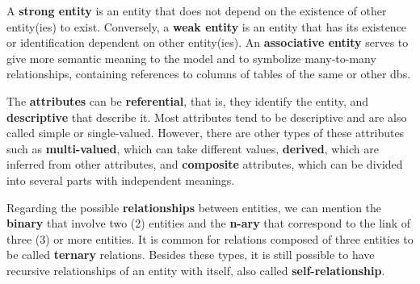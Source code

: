A \textbf{strong entity} is an entity that does not depend on the existence of other entity(ies) to exist.
Conversely, a \textbf{weak entity} is an entity that has its existence or identification dependent on other entity(ies).
An \textbf{associative entity} serves to give more semantic meaning to the model and to symbolize many-to-many relationships, containing references to columns of tables of the same or other \acp{db}.

The \textbf{attributes} can be \textbf{referential}, that is, they identify the entity, and \textbf{descriptive} that describe it.
Most attributes tend to be descriptive and are also called simple or single-valued.
However, there are other types of these attributes such as \textbf{multi-valued}, which can take different values, \textbf{derived}, which are inferred from other attributes, and \textbf{composite} attributes, which can be divided into several parts with independent meanings.

Regarding the possible \textbf{relationships} between entities, we can mention the \textbf{binary} that involve two (2) entities and the \textbf{n-ary} that correspond to the link of three (3) or more entities.
It is common for relations composed of three entities to be called \textbf{ternary} relations.
Besides these types, it is still possible to have recursive relationships of an entity with itself, also called \textbf{self-relationship}.

